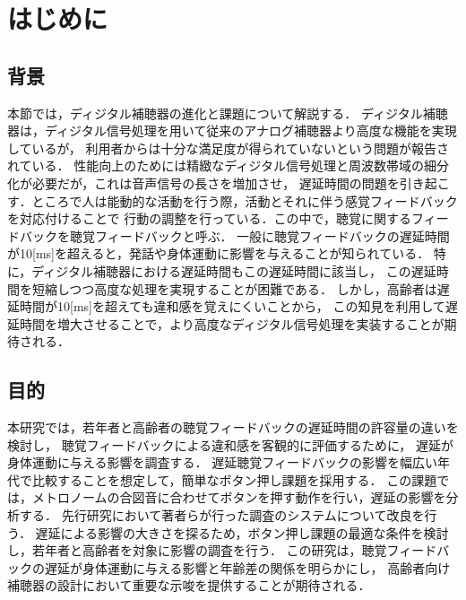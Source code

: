 \section{はじめに}
\subsection{背景}
本節では，ディジタル補聴器の進化と課題について解説する．
ディジタル補聴器は，ディジタル信号処理を用いて従来のアナログ補聴器より高度な機能を実現しているが，
利用者からは十分な満足度が得られていないという問題が報告されている\cite{cf:Manzokudo}．
性能向上のためには精緻なディジタル信号処理と周波数帯域の細分化が必要だが，これは音声信号の長さを増加させ，
遅延時間の問題を引き起こす．ところで人は能動的な活動を行う際，活動とそれに伴う感覚フィードバックを対応付けることで
行動の調整を行っている．この中で，聴覚に関するフィードバックを聴覚フィードバックと呼ぶ\cite{cf:DAF}．
一般に聴覚フィードバックの遅延時間が10[ms]を超えると，発話や身体運動に影響を与えることが知られている\cite{cf:DelayTime-ninnchi}．
特に，ディジタル補聴器における遅延時間もこの遅延時間に該当し，
この遅延時間を短縮しつつ高度な処理を実現することが困難である．
しかし，高齢者は遅延時間が10[ms]を超えても違和感を覚えにくいことから，
この知見を利用して遅延時間を増大させることで，より高度なディジタル信号処理を実装することが期待される．
\subsection{目的}
本研究では，若年者と高齢者の聴覚フィードバックの遅延時間の許容量の違いを検討し，
聴覚フィードバックによる違和感を客観的に評価するために，
遅延が身体運動に与える影響を調査する．
遅延聴覚フィードバックの影響を幅広い年代で比較することを想定して，簡単なボタン押し課題を採用する．
この課題では，メトロノームの合図音に合わせてボタンを押す動作を行い，遅延の影響を分析する．
先行研究\cite{cf:shigematu}において著者らが行った調査のシステムについて改良を行う．
遅延による影響の大きさを探るため，ボタン押し課題の最適な条件を検討し，若年者と高齢者を対象に影響の調査を行う．
この研究は，聴覚フィードバックの遅延が身体運動に与える影響と年齢差の関係を明らかにし，
高齢者向け補聴器の設計において重要な示唆を提供することが期待される．
